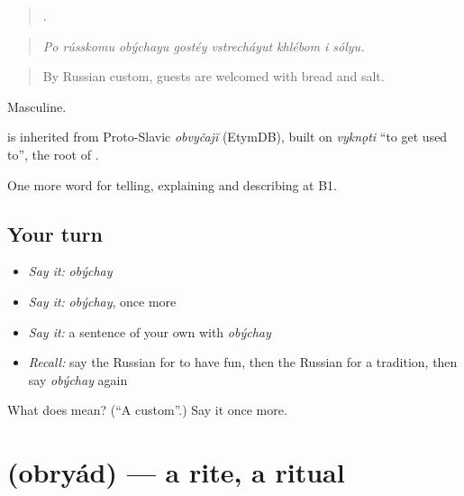 \begin{quote}
       .
\end{quote}

\begin{quote}
\emph{Po rússkomu obýchayu gostéy vstrecháyut khlébom i sólyu.}
\end{quote}

\begin{quote}
By Russian custom, guests are welcomed with bread and salt.
\end{quote}

Masculine.

\begin{cousinweb}
\emph{} is inherited from Proto-Slavic \emph{obvyčajĭ} (EtymDB), built on \emph{vyknǫti} \textquotedblleft{}to get used to\textquotedblright{}, the root of \emph{}.
\end{cousinweb}

\begin{grammarlens}[title={What you've built}]
One more word for telling, explaining and describing at B1.
\end{grammarlens}

\subsection*{Your turn}
\begin{itemize}
\raggedright
  \item \emph{Say it:} \emph{obýchay}
  \item \emph{Say it:} \emph{obýchay}, once more
  \item \emph{Say it:} a sentence of your own with \emph{obýchay}
  \item \emph{Recall:} say the Russian for to have fun, then the Russian for a tradition, then say \emph{obýchay} again
\end{itemize}

\begin{tcolorbox}[breakable,colback=teal!4,colframe=teal!35!black,title={Before you move on}]
What does  mean? (\textquotedblleft{}A custom\textquotedblright{}.) Say it once more.
\end{tcolorbox}
\section[\texorpdfstring{\ru{обряд} (obryád)}{обряд (obryád)}]{ (obryád) — a rite, a ritual}

